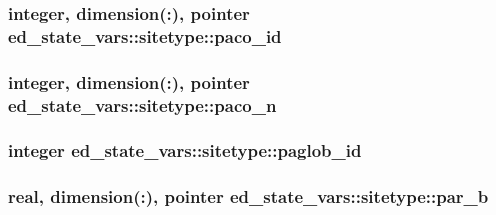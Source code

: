 \subsubsection[{\texorpdfstring{paco\+\_\+id}{paco_id}}]{\setlength{\rightskip}{0pt plus 5cm}integer, dimension(\+:), pointer ed\+\_\+state\+\_\+vars\+::sitetype\+::paco\+\_\+id}\hypertarget{structed__state__vars_1_1sitetype_a22d10e38290ca0045355f9f9e887087d}{}\label{structed__state__vars_1_1sitetype_a22d10e38290ca0045355f9f9e887087d}
\subsubsection[{\texorpdfstring{paco\+\_\+n}{paco_n}}]{\setlength{\rightskip}{0pt plus 5cm}integer, dimension(\+:), pointer ed\+\_\+state\+\_\+vars\+::sitetype\+::paco\+\_\+n}\hypertarget{structed__state__vars_1_1sitetype_a07aabc20329d63b94c72ee5a6b7ef9a8}{}\label{structed__state__vars_1_1sitetype_a07aabc20329d63b94c72ee5a6b7ef9a8}
\subsubsection[{\texorpdfstring{paglob\+\_\+id}{paglob_id}}]{\setlength{\rightskip}{0pt plus 5cm}integer ed\+\_\+state\+\_\+vars\+::sitetype\+::paglob\+\_\+id}\hypertarget{structed__state__vars_1_1sitetype_ae3b8d3e3d980ea2b191f93ab1f82e9f9}{}\label{structed__state__vars_1_1sitetype_ae3b8d3e3d980ea2b191f93ab1f82e9f9}
\subsubsection[{\texorpdfstring{par\+\_\+b}{par_b}}]{\setlength{\rightskip}{0pt plus 5cm}real, dimension(\+:), pointer ed\+\_\+state\+\_\+vars\+::sitetype\+::par\+\_\+b}\hypertarget{structed__state__vars_1_1sitetype_a8d26d5d1bd3be5cb0de3ba118aa5460e}{}\label{structed__state__vars_1_1sitetype_a8d26d5d1bd3be5cb0de3ba118aa5460e}
